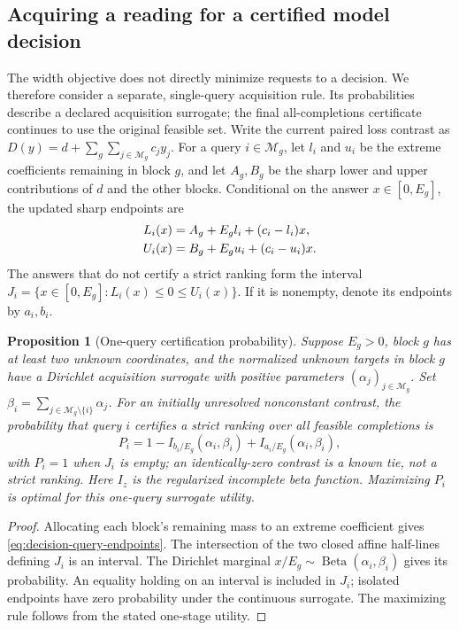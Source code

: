 \documentclass[12pt]{article}
\newtheorem{proposition}{Proposition}
\begin{document}
\subsection{Acquiring a reading for a certified model decision}
\label{sec:decision-acquisition}
The width objective does not directly minimize requests to a decision.
We therefore consider a separate, single-query acquisition rule. Its
probabilities describe a declared acquisition surrogate; the final
all-completions certificate continues to use the original feasible set.
Write the current paired loss contrast as
$D(y)=d+\sum_g\sum_{j\in\mathcal M_g}c_jy_j$.
For a query $i\in\mathcal M_g$, let $l_i$ and $u_i$ be the extreme
coefficients remaining in block $g$, and let $A_g,B_g$ be the sharp
lower and upper contributions of $d$ and the other blocks. Conditional
on the answer $x\in[0,E_g]$, the updated sharp endpoints are
\begin{align}
 L_i(x)&=A_g+E_gl_i+(c_i-l_i)x,\notag\\
 U_i(x)&=B_g+E_gu_i+(c_i-u_i)x.\label{eq:decision-query-endpoints}
\end{align}
The answers that do not certify a strict ranking form the interval
$J_i=\{x\in[0,E_g]:L_i(x)\leq0\leq U_i(x)\}$.
If it is nonempty, denote its endpoints by $a_i,b_i$.

\begin{proposition}[One-query certification probability]
\label{prop:decision-query-probability}
Suppose $E_g>0$, block $g$ has at least two unknown coordinates, and
the normalized unknown targets in block $g$ have a Dirichlet
acquisition surrogate with positive parameters $(\alpha_j)_{j\in\mathcal M_g}$.
Set $\beta_i=\sum_{j\in\mathcal M_g\setminus\{i\}}\alpha_j$.
For an initially unresolved nonconstant contrast, the probability
that query $i$ certifies a strict ranking over all feasible completions is
\begin{equation}
 P_i=1-I_{b_i/E_g}(\alpha_i,\beta_i)
       +I_{a_i/E_g}(\alpha_i,\beta_i),
 \label{eq:decision-query-probability}
\end{equation}
with $P_i=1$ when $J_i$ is empty; an identically-zero contrast is
a known tie, not a strict ranking. Here $I_z$ is the regularized incomplete
beta function. Maximizing $P_i$ is optimal for this one-query surrogate
utility.
\end{proposition}
\begin{proof}
Allocating each block's remaining mass to an extreme coefficient gives
\eqref{eq:decision-query-endpoints}. The intersection of the two closed affine
half-lines defining $J_i$ is an interval. The Dirichlet marginal
$x/E_g\sim\operatorname{Beta}(\alpha_i,\beta_i)$ gives its probability.
An equality holding on an interval is included in $J_i$; isolated
endpoints have zero probability under the continuous
surrogate. The maximizing rule follows from the stated one-stage utility.
\end{proof}
\end{document}
